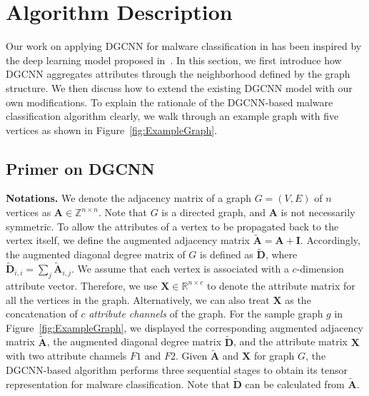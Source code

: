 \section{Algorithm Description}
\label{MG:Sec:DGCNN}

Our work on applying DGCNN for malware classification in \sysname has been inspired by the deep learning model proposed in~\cite{Dgcnn}. In this section, we first introduce how DGCNN aggregates attributes through the neighborhood defined by the graph structure. We then discuss how to extend the existing DGCNN model with our own modifications. To explain the rationale of the DGCNN-based malware classification algorithm clearly, we walk through an example graph with five vertices as shown in Figure~\ref{fig:ExampleGraph}.

\subsection{Primer on DGCNN}

\textbf{Notations.} We denote the adjacency matrix of a graph $G=(V, E)$ of $n$ vertices as $\mathbf{A} \in \mathbb{Z} ^{n\times n}$.
Note that $G$ is a directed graph, and $\mathbf{A}$ is not necessarily symmetric.
To allow the attributes of a vertex to be propagated back to the vertex itself, we define the augmented adjacency matrix $\tilde{\mathbf{A}} = \mathbf{A} + \mathbf{I}$.
Accordingly, the augmented diagonal degree matrix of $G$ is defined as $\tilde{\mathbf{D}}$, where
$\tilde{\mathbf{D}}_{i,i} = \sum_j \tilde{\mathbf{A}}_{i,j}$.
We assume that each vertex is associated with a $c$-dimension attribute vector.
Therefore, we use $\mathbf{X} \in \mathbb{R}^{n \times c}$ to denote the attribute matrix for all the vertices in the graph. %
Alternatively, we can also treat $\mathbf{X}$ as the concatenation of $c$ \textit{attribute channels} of the graph.
For the sample graph $g$ in Figure~\ref{fig:ExampleGraph}, we displayed the corresponding augmented adjacency matrix $\tilde{\mathbf{A}}$, the augmented diagonal degree matrix $\tilde{\mathbf{D}}$, and the attribute matrix $\mathbf{X}$ with two attribute channels $F1$ and $F2$.
Given $\tilde{\mathbf{A}}$ and $\mathbf{X}$ for graph $G$, the DGCNN-based algorithm performs three sequential stages to obtain its tensor representation for malware classification. Note that $\tilde{\mathbf{D}}$ can be calculated from $\tilde{\mathbf{A}}$.

